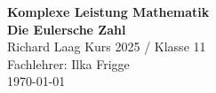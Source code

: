 \begin{titlepage}
  \thispagestyle{empty}
  \begin{center}
        \vspace*{1cm}
        \huge
        \textbf{Komplexe Leistung Mathematik}\\
        \vspace{0.5cm}
        \Huge
        \textbf{Die Eulersche Zahl\\}
        \vspace{1.5cm}
        \Large
        Richard Laag
        \vfill
        Kurs 2025 / Klasse 11\\
        Fachlehrer: Ilka Frigge\\
        \today
            
    \end{center}
  \end{titlepage}
\newpage
